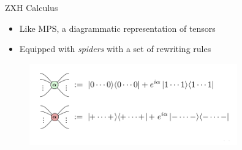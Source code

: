 \documentclass[aspectratio=169,xcolor=dvipsnames, t]{beamer}
\begin{document}
\begin{frame}{ZXH Calculus}
\begin{itemize}
    \item Like MPS, a diagrammatic representation of tensors
    \item Equipped with \textit{spiders} with a set of rewriting rules

\end{itemize}
    \begin{figure}
        \centering
        \includegraphics[width=0.8\textwidth]{figures/zx_spiders.png}
    \end{figure}
\end{frame}
\end{document}
